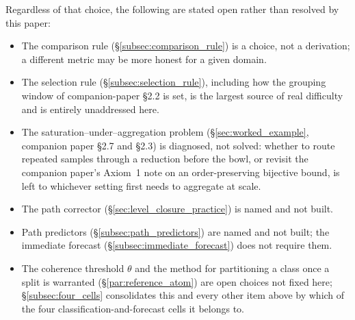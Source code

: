 \documentclass[12pt, a4paper]{article}
\begin{document}
Regardless of that choice, the following are stated open rather than
resolved by this paper:

\begin{itemize}
\item The comparison rule (\S\ref{subsec:comparison_rule}) is a
      choice, not a derivation; a different metric may be more honest
      for a given domain.
\item The selection rule (\S\ref{subsec:selection_rule}), including
      how the grouping window of companion-paper \S2.2 is set, is the
      largest source of real difficulty and is entirely unaddressed
      here.
\item The saturation--under--aggregation problem
      (\S\ref{sec:worked_example}, companion paper \S2.7 and \S2.3) is
      diagnosed, not solved: whether to route repeated samples through
      a reduction before the bowl, or revisit the companion paper's
      Axiom~1 note on an order-preserving bijective bound, is left to
      whichever setting first needs to aggregate at scale.
\item The path corrector (\S\ref{sec:level_closure_practice}) is named
      and not built.
\item Path predictors (\S\ref{subsec:path_predictors}) are named and
      not built; the immediate forecast
      (\S\ref{subsec:immediate_forecast}) does not require them.
\item The coherence threshold $\theta$ and the method for
      partitioning a class once a split is warranted
      (\S\ref{par:reference_atom}) are open choices not fixed here;
      \S\ref{subsec:four_cells} consolidates this and every other item
      above by which of the four classification-and-forecast cells it
      belongs to.
\end{itemize}
\end{document}
